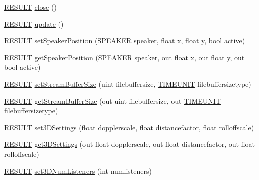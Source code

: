 \begin{DoxyCompactItemize}
\item 
\hyperlink{namespace_f_m_o_d_a305d1176ef3f8c8815861a60407ac33d}{R\+E\+S\+U\+LT} \hyperlink{class_f_m_o_d_1_1_system_a5827a74194da6eb5126fabda4cdcfaf5}{close} ()
\item 
\hyperlink{namespace_f_m_o_d_a305d1176ef3f8c8815861a60407ac33d}{R\+E\+S\+U\+LT} \hyperlink{class_f_m_o_d_1_1_system_a88ff07d3c56a36518d179100c8ef1fab}{update} ()
\item 
\hyperlink{namespace_f_m_o_d_a305d1176ef3f8c8815861a60407ac33d}{R\+E\+S\+U\+LT} \hyperlink{class_f_m_o_d_1_1_system_a09af3ab8333e4f0d87001958b38d4262}{set\+Speaker\+Position} (\hyperlink{namespace_f_m_o_d_a5ccb2623e74daa810e486429d60e4f48}{S\+P\+E\+A\+K\+ER} speaker, float x, float y, bool active)
\item 
\hyperlink{namespace_f_m_o_d_a305d1176ef3f8c8815861a60407ac33d}{R\+E\+S\+U\+LT} \hyperlink{class_f_m_o_d_1_1_system_a55fcdf28d176b0249892c87e2fc90afd}{get\+Speaker\+Position} (\hyperlink{namespace_f_m_o_d_a5ccb2623e74daa810e486429d60e4f48}{S\+P\+E\+A\+K\+ER} speaker, out float x, out float y, out bool active)
\item 
\hyperlink{namespace_f_m_o_d_a305d1176ef3f8c8815861a60407ac33d}{R\+E\+S\+U\+LT} \hyperlink{class_f_m_o_d_1_1_system_a0300ff1040401d2ce49d4766b733ddcb}{set\+Stream\+Buffer\+Size} (uint filebuffersize, \hyperlink{namespace_f_m_o_d_aff20975332f93ff2180d2681cb43929f}{T\+I\+M\+E\+U\+N\+IT} filebuffersizetype)
\item 
\hyperlink{namespace_f_m_o_d_a305d1176ef3f8c8815861a60407ac33d}{R\+E\+S\+U\+LT} \hyperlink{class_f_m_o_d_1_1_system_ad87710f2978de4f283be1fddc902d502}{get\+Stream\+Buffer\+Size} (out uint filebuffersize, out \hyperlink{namespace_f_m_o_d_aff20975332f93ff2180d2681cb43929f}{T\+I\+M\+E\+U\+N\+IT} filebuffersizetype)
\item 
\hyperlink{namespace_f_m_o_d_a305d1176ef3f8c8815861a60407ac33d}{R\+E\+S\+U\+LT} \hyperlink{class_f_m_o_d_1_1_system_a146005590d491f09f76afa73706a0e92}{set3\+D\+Settings} (float dopplerscale, float distancefactor, float rolloffscale)
\item 
\hyperlink{namespace_f_m_o_d_a305d1176ef3f8c8815861a60407ac33d}{R\+E\+S\+U\+LT} \hyperlink{class_f_m_o_d_1_1_system_ad6727352e8d1bc56dc7140d87da33da3}{get3\+D\+Settings} (out float dopplerscale, out float distancefactor, out float rolloffscale)
\item 
\hyperlink{namespace_f_m_o_d_a305d1176ef3f8c8815861a60407ac33d}{R\+E\+S\+U\+LT} \hyperlink{class_f_m_o_d_1_1_system_a243d0b61050df5d94b2d5ecc92b6e08e}{set3\+D\+Num\+Listeners} (int numlisteners)

\end{DoxyCompactItemize}
